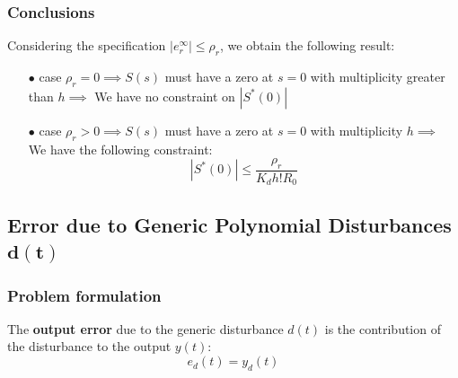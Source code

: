 \documentclass[a4paper,10pt,titlepage]{article}
\numberwithin{equation}{subsection}
\begin{document}
	\subsubsection{Conclusions}
	Considering the specification $\left|e_r^\infty\right| \leq \rho_r  $, we obtain the following result:
	\begin{enumerate}
		\item[$\bullet$] case $\rho_r=0 \implies S(s)$ must have a zero at $s=0$ with multiplicity greater than $h \implies$ We have no constraint on $\left|S^*(0)\right| $ 
		\item[$\bullet$] case $\rho_r>0 \implies S(s)$ must have a zero at $s=0$ with multiplicity $h \implies$ We have the following constraint:
		\begin{equation}
			\left|S^*(0)\right| \leq \dfrac{\rho_r}{K_dh!R_0}	
		\end{equation}
	\end{enumerate}
	
	\subsection{Error due to Generic Polynomial Disturbances $\bm{d(t)}$}
	\subsubsection{Problem formulation}
	The \textbf{output error} due to the generic disturbance $d(t)$ is the contribution of the disturbance to the output $y(t)$:
	\begin{equation}
		e_d(t) = y_d(t)
	\end{equation}
	
\end{document}
